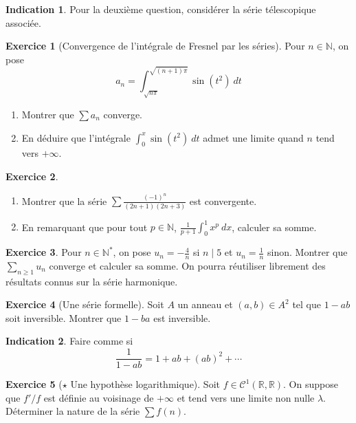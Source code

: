 \documentclass[french]{book}
\newcommand{\N}{\mathbb{N}}
\newcommand{\R}{\mathbb{R}}
\newcommand{\st}{^*}
\theoremstyle{definition}
\newtheorem{ex}{Exercice}[chapter]
\theoremstyle{theorem}
\newtheorem*{ind}{Indication}
\theoremstyle{remark}
\begin{document}
\begin{ind}
	Pour la deuxième question, considérer la série télescopique associée.
\end{ind}

\begin{ex}[Convergence de l'intégrale de Fresnel par les séries]
	Pour $n\in\N$, on pose $$a_n=\displaystyle\int_{\sqrt{n\pi}}^{\sqrt{(n+1)\pi}}\sin(t^2)\ dt$$
	\begin{enumerate}
		\item Montrer que $\displaystyle\sum a_n$ converge.
		\item En déduire que l'intégrale $\displaystyle\int_{0}^{x}\sin(t^2)\ dt$ admet une limite quand $n$ tend vers $+\infty$.
	\end{enumerate}
\end{ex}

\begin{ex}
	\begin{enumerate}
		\item Montrer que la série $\displaystyle\sum\frac{(-1)^n}{(2n+1)(2n+3)}$ est convergente.
		\item En remarquant que pour tout $p\in\N$, $\displaystyle\frac{1}{p+1}\int_{0}^{1}x^p\ dx$, calculer sa somme.
	\end{enumerate}
\end{ex}

\begin{ex}
	Pour $n\in\N\st$, on pose $u_n=\displaystyle-\frac{4}{n}$ si $n\mid 5$ et $u_n=\frac{1}{n}$ sinon. Montrer que $\displaystyle\sum_{n\geqslant1}u_n$ converge et calculer sa somme. On pourra réutiliser librement des résultats connus sur la série harmonique.
\end{ex}

\begin{ex}[Une série formelle]
	Soit $A$ un anneau et $(a,b)\in A^2$ tel que $1-ab$ soit inversible. Montrer que $1-ba$ est inversible.
\end{ex}

\begin{ind}
	Faire comme si $$\frac{1}{1-ab}=1+ab+(ab)^2+\cdots$$
\end{ind}

\begin{ex}[$\star$ Une hypothèse logarithmique]
	Soit $f\in\mathcal{C}^1(\R,\R)$. On suppose que $f'/f$ est définie au voisinage de $+\infty$ et tend vers une limite non nulle $\lambda$. Déterminer la nature de la série $\sum f(n)$.
\end{ex}
\end{document}
